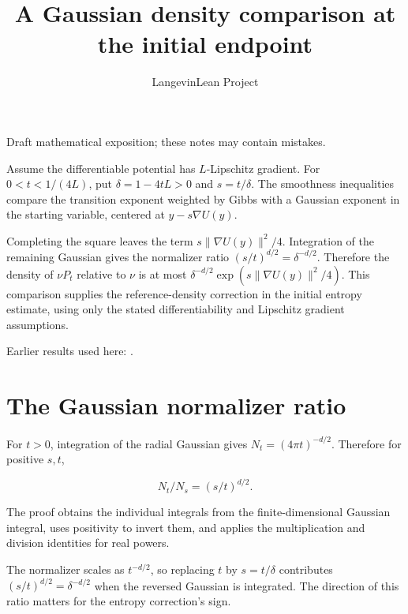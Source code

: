 \documentclass[11pt,a4paper]{article}
\title{\texorpdfstring{A Gaussian density comparison at the initial endpoint}{A Gaussian density comparison at the initial endpoint}}
\author{LangevinLean Project}
\date{}
\begin{document}
\maketitle
Draft mathematical exposition; these notes may contain mistakes.


Assume the differentiable potential has \(L\)-Lipschitz gradient. For \(0<t<1/(4L)\), put \(\delta=1-4tL>0\) and \(s=t/\delta\). The smoothness inequalities compare the transition exponent weighted by Gibbs with a Gaussian exponent in the starting variable, centered at \(y-s\nabla U(y)\).



Completing the square leaves the term \(s\|\nabla U(y)\|^2/4\). Integration of the remaining Gaussian gives the normalizer ratio \((s/t)^{d/2}=\delta^{-d/2}\). Therefore the density of \(\nu P_t\) relative to \(\nu\) is at most \(\delta^{-d/2}\exp(s\|\nabla U(y)\|^2/4)\). This comparison supplies the reference-density correction in the initial entropy estimate, using only the stated differentiability and Lipschitz gradient assumptions.



Earlier results used here: \cite[Section~3.46]{LangevinLean2026ULASC}.

\section{\texorpdfstring{The Gaussian normalizer ratio}{The Gaussian normalizer ratio}}


For \(t>0\), integration of the radial Gaussian gives \(N_t=(4\pi t)^{-d/2}\). Therefore for positive \(s,t\),

\[N_t/N_s=(s/t)^{d/2}.\]

The proof obtains the individual integrals from the finite-dimensional Gaussian integral, uses positivity to invert them, and applies the multiplication and division identities for real powers.



The normalizer scales as \(t^{-d/2}\), so replacing \(t\) by \(s=t/\delta\) contributes \((s/t)^{d/2}=\delta^{-d/2}\) when the reversed Gaussian is integrated. The direction of this ratio matters for the entropy correction's sign.
\end{document}
